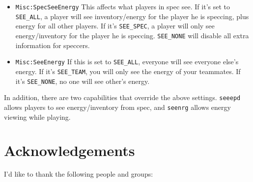 \documentclass{article}
\begin{document}
\begin{itemize}

\item{\texttt{Misc:SpecSeeEnergy}} This affects what players in spec
see. If it's set to \verb/SEE_ALL/, a player will see inventory/energy
for the player he is speccing, plus energy for all other players. If
it's \verb/SEE_SPEC/, a player will only see energy/inventory for the
player he is speccing.  \verb/SEE_NONE/ will disable all extra
information for speccers.

\item{\texttt{Misc:SeeEnergy}} If this is set to \verb/SEE_ALL/,
everyone will see everyone else's energy.  If it's \verb/SEE_TEAM/, you
will only see the energy of your teammates. If it's \verb/SEE_NONE/, no
one will see other's energy.

\end{itemize}

In addition, there are two capabilities that override the above
settings. \verb/seeepd/ allows players to see energy/inventory from
spec, and \verb/seenrg/ allows energy viewing while playing.


\section{Acknowledgements}

I'd like to thank the following people and groups:
\end{document}
